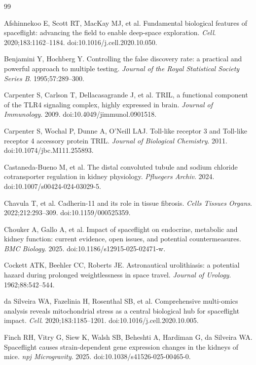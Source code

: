 \documentclass[11pt]{article}
\begin{document}
\clearpage
\begin{thebibliography}{99}\small

 Afshinnekoo E, Scott RT, MacKay MJ, et al. Fundamental biological features of spaceflight: advancing the field to enable deep-space exploration. \emph{Cell}. 2020;183:1162--1184. doi:10.1016/j.cell.2020.10.050.

 Benjamini Y, Hochberg Y. Controlling the false discovery rate: a practical and powerful approach to multiple testing. \emph{Journal of the Royal Statistical Society Series B}. 1995;57:289--300.

 Carpenter S, Carlson T, Dellacasagrande J, et al. TRIL, a functional component of the TLR4 signaling complex, highly expressed in brain. \emph{Journal of Immunology}. 2009. doi:10.4049/jimmunol.0901518.

 Carpenter S, Wochal P, Dunne A, O'Neill LAJ. Toll-like receptor 3 and Toll-like receptor 4 accessory protein TRIL. \emph{Journal of Biological Chemistry}. 2011. doi:10.1074/jbc.M111.255893.

 Castaneda-Bueno M, et al. The distal convoluted tubule and sodium chloride cotransporter regulation in kidney physiology. \emph{Pfluegers Archiv}. 2024. doi:10.1007/s00424-024-03029-5.

 Chavula T, et al. Cadherin-11 and its role in tissue fibrosis. \emph{Cells Tissues Organs}. 2022;212:293--309. doi:10.1159/000525359.

 Chouker A, Gallo A, et al. Impact of spaceflight on endocrine, metabolic and kidney function: current evidence, open issues, and potential countermeasures. \emph{BMC Biology}. 2025. doi:10.1186/s12915-025-02471-w.

 Cockett ATK, Beehler CC, Roberts JE. Astronautical urolithiasis: a potential hazard during prolonged weightlessness in space travel. \emph{Journal of Urology}. 1962;88:542--544.

 da Silveira WA, Fazelinia H, Rosenthal SB, et al. Comprehensive multi-omics analysis reveals mitochondrial stress as a central biological hub for spaceflight impact. \emph{Cell}. 2020;183:1185--1201. doi:10.1016/j.cell.2020.10.005.

 Finch RH, Vitry G, Siew K, Walsh SB, Beheshti A, Hardiman G, da Silveira WA. Spaceflight causes strain-dependent gene expression changes in the kidneys of mice. \emph{npj Microgravity}. 2025. doi:10.1038/s41526-025-00465-0.


\end{thebibliography}
\end{document}

